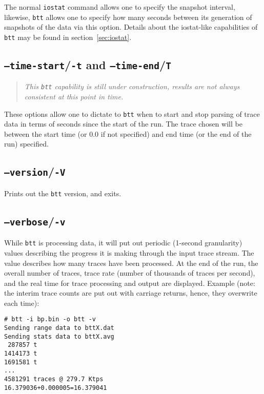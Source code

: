 \documentclass{article}
\begin{document}
  The normal \texttt{iostat} command allows one to specify the snapshot
  interval, likewise, \texttt{btt} allows one to specify how many seconds
  between its generation of snapshots of the data via this option. Details
  about the iostat-like capabilities of \texttt{btt} may be found in
  section~\ref{sec:iostat}.

\subsection{\label{sec:o-tT}\texttt{--time-start}/\texttt{-t} and
\texttt{--time-end}/\texttt{T}}

  \begin{quote}
    \emph{This \texttt{btt} capability is still under construction, results are
    not always consistent at this point in time.}
  \end{quote}

  These options allow one to dictate to \texttt{btt} when to start and stop
  parsing of trace data in terms of seconds since the start of the run. The
  trace chosen will be between the start time (or 0.0 if not
  specified) and end time (or the end of the run) specified. 

\subsection{\label{sec:o-V}\texttt{--version}/\texttt{-V}}

  Prints out the \texttt{btt} version, and exits.

\subsection{\label{sec:o-v}\texttt{--verbose}/\texttt{-v}}

  While \texttt{btt} is processing data, it will put out periodic (1-second
  granularity) values describing the progress it is making through the
  input trace stream. The value describes how many traces have been
  processed. At the end of the run, the overall number of traces, trace
  rate (number of thousands of traces per second), and the real time for
  trace processing and output are displayed. Example (note: the interim
  trace counts are put out with carriage returns, hence, they overwrite
  each time):

\begin{verbatim}
# btt -i bp.bin -o btt -v
Sending range data to bttX.dat
Sending stats data to bttX.avg
 287857 t
1414173 t
1691581 t
...
4581291 traces @ 279.7 Ktps
16.379036+0.000005=16.379041
\end{verbatim}
\end{document}

